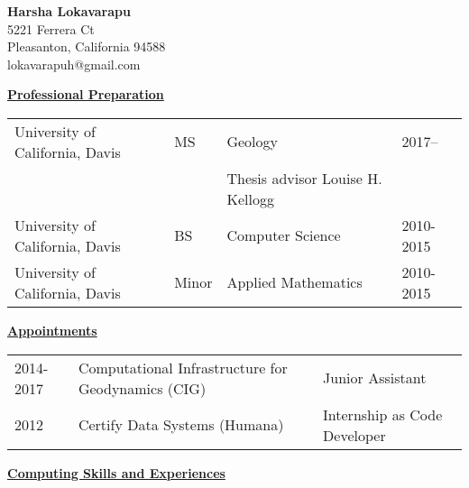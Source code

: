 \documentclass[11pt]{ltxdoc}
\begin{document}
\begin{center}
  \textbf{Harsha Lokavarapu}      \\ [06pt]
  5221 Ferrera Ct                 \\
  Pleasanton, California 94588    \\
  lokavarapuh@gmail.com           \\  [3pt]
\end{center}


\vskip 12pt

\begin{center}
	\textbf{\underline{Professional Preparation}}
\end{center}

\vskip -06pt

\begin{tabular}{llll}
University of California, Davis              &MS     &Geology       & 2017-- \\
                                             &       &Thesis advisor Louise H. Kellogg &  \\
University of California, Davis              &BS     &Computer Science  & 2010-2015       \\
University of California, Davis              &Minor   &Applied Mathematics & 2010-2015
\end{tabular}

\vskip 18pt

\begin{center}
	\textbf{\underline{Appointments}}
\end{center}

\begin{tabular}{lll}
2014-2017     & Computational Infrastructure for Geodynamics (CIG) & Junior Assistant \\
2012       & Certify Data Systems (Humana) & Internship as Code Developer
\end{tabular}

\vskip 18pt

\begin{center}
	\textbf{\underline{Computing Skills and Experiences}}
\end{center}
\end{document}
